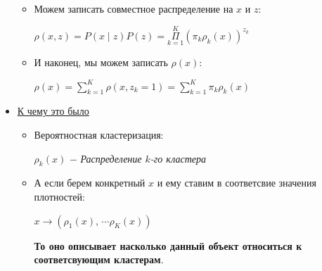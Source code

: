 \begin{itemize}
\begin{itemize}
                    \item Можем записать совместное распределение на $x$ и $z$:
                    \begin{center}
                        \large
                        $\rho(x , z) = P(x \mid z) P(z) = \Pi\limits_{k = 1}^K (\pi_k \rho_k(x))^{z_k}$ 
                    \end{center}

                    \item И наконец, мы можем записать $\rho(x)$:
                    \begin{center}
                        \large
                        $\rho(x) = \sum\limits_{k = 1}^K  \rho(x, z_k = 1 ) = \sum\limits_{k = 1}^K  \pi_k \rho_k(x)$
                    \end{center}
                \end{itemize}

                \item \underline{К чему это было}
                \begin{itemize}
                    \item Вероятностная кластеризация:
                    \begin{center}
                    \large
                        $\rho_k(x)$ $-$ \textit{Распределение $k$-го кластера}
                    \end{center}

                    \item А если берем конкретный $x$ и ему ставим в соответсвие значения плотностей:
                    \begin{center}
                        \large
                        $x \to (\rho_1(x), \, \cdots \rho_K(x))$
                    \end{center}
                    \textbf{То оно описывает насколько данный объект относиться к соответсвующим кластерам}.
                \end{itemize}
            \end{itemize}

            \hline

